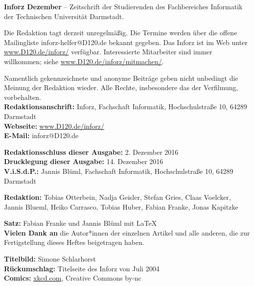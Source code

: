\vfill
{}
\small

\textbf{Inforz Dezember \the\year} – Zeitschrift der Studierenden des Fachbereiches Informatik der Technischen Universität Darmstadt.

\vspace{3mm}
Die Redaktion tagt derzeit unregelmäßig. Die Termine werden über die offene Mailingliste inforz-helfer@D120.de bekannt gegeben. Das Inforz ist  im Web unter \url{www.D120.de/inforz/} verfügbar. Interessierte Mitarbeiter sind immer willkommen; siehe  \url{www.D120.de/inforz/mitmachen/}.

\vspace{3mm}
Namentlich gekennzeichnete und anonyme Beiträge geben nicht unbedingt die Meinung der Redaktion wieder. Alle Rechte, insbesondere das der Verfilmung, vorbehalten. \\


\textbf{Redaktionsanschrift:} Inforz, Fachschaft Informatik, Hochschulstraße 10, 64289 Darmstadt\\
\textbf{Webseite:} \url{www.D120.de/inforz/}\\
\textbf{E-Mail:} inforz@D120.de

\vspace{3mm}
\textbf{Redaktionsschluss dieser Ausgabe:} 2. Dezember 2016\\
\textbf{Drucklegung dieser Ausgabe:} 14. Dezember 2016\\
\textbf{V.i.S.d.P.:} Jannis Blüml, Fachschaft Informatik, Hochschulstraße 10, 64289 Darmstadt

\vspace{3mm}
\textbf{Redaktion:} Tobias Otterbein, Nadja Geisler, Stefan Gries, Claas
Voelcker, Jannis Blueml, Heiko Carrasco, Tobias Huber, Fabian Franke, Jonas
Kapitzke

\vspace{3mm}
\textbf{Satz:} Fabian Franke und Jannis Blüml mit \LaTeX\\

\vspace{3mm}
\textbf{Vielen Dank an} die Autor*innen der einzelnen Artikel und alle anderen, die zur Fertigstellung dieses Heftes beigetragen haben.

\vspace{3mm}
\textbf{Titelbild:} Simone Schlarhorst\\
\textbf{Rückumschlag:} Titelseite des Inforz von Juli 2004\\
\textbf{Comics:} \url{xkcd.com}, Creative Commons by-nc

